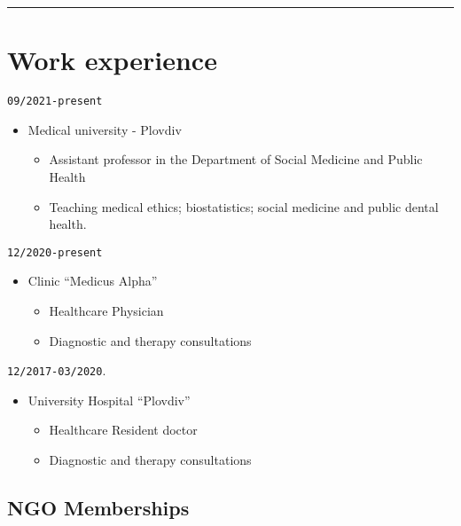 \documentclass[
  12pt,
  letterpaper,
  DIV=11,
  numbers=noendperiod]{scrartcl}
\providecommand{\tightlist}{%
  \setlength{\itemsep}{0pt}\setlength{\parskip}{0pt}}\usepackage{longtable,booktabs,array}
\begin{document}
\begin{center}\rule{0.5\linewidth}{0.5pt}\end{center}

\section{Work experience}\label{work-experience}

\texttt{09/2021-present}

\begin{itemize}
\tightlist
\item
  Medical university - Plovdiv

  \begin{itemize}
  \tightlist
  \item
    Assistant professor in the Department of Social Medicine and Public
    Health
  \item
    Teaching medical ethics; biostatistics; social medicine and public
    dental health.
  \end{itemize}
\end{itemize}

\texttt{12/2020-present}

\begin{itemize}
\tightlist
\item
  Clinic ``Medicus Alpha''

  \begin{itemize}
  \tightlist
  \item
    Healthcare \textbar{} Physician
  \item
    Diagnostic and therapy consultations
  \end{itemize}
\end{itemize}

\texttt{12/2017-03/2020}.

\begin{itemize}
\tightlist
\item
  University Hospital ``Plovdiv''

  \begin{itemize}
  \tightlist
  \item
    Healthcare \textbar{} Resident doctor
  \item
    Diagnostic and therapy consultations
  \end{itemize}
\end{itemize}

\subsection{NGO Memberships}\label{ngo-memberships}
\end{document}
